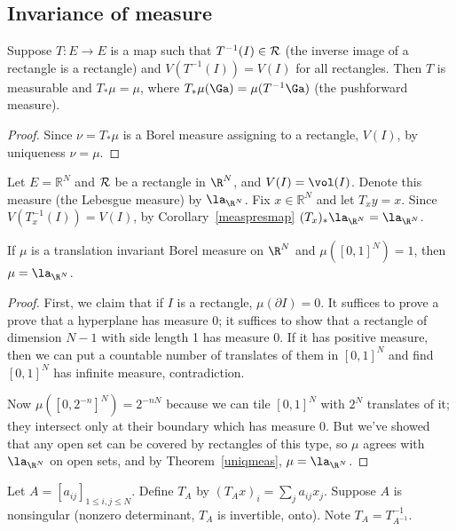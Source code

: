 \subsection{Invariance of measure}
\begin{cor}\label{measpresmap}
Suppose $T:E\to E$ is a map such that $T^{-1}(I)\in \cal R$ (the inverse image of a rectangle is a rectangle) and $V(T^{-1}(I))=V(I)$ for all rectangles. Then $T$ is measurable %
and $T_*\mu=\mu$, where $T_*\mu(\Ga)=\mu(T^{-1}\Ga)$ (the pushforward measure).
\end{cor}
\begin{proof}
Since $\nu=T_*\mu$ is a Borel measure assigning to a rectangle, $V(I)$, by uniqueness $\nu=\mu$.
\end{proof}
Let $E=\mathbb R^N$ and $\cal R$ be a rectangle in $\R^N$, and $V(I)=\vol(I)$. Denote this measure (the Lebesgue measure) by $\la_{\R^N}$. Fix $x\in \mathbb R^N$ and let $T_xy=x$. Since $V(T_x^{-1}(I))=V(I)$, by Corollary~\ref{measpresmap} $(T_x)_* \la_{\R^N}=\la_{\R^N}$. 
\begin{thm}
If $\mu$ is a translation invariant Borel measure on $\R^N$ and $\mu([0,1]^N)=1$, then $\mu=\la_{\R^N}$.
\end{thm}
\begin{proof}
First, we claim that if $I$ is a rectangle, $\mu(\partial I)=0$. It suffices to prove a prove that a hyperplane has measure 0; it suffices to show that a rectangle of dimension $N-1$ with side length 1 has measure 0. If it has positive measure, then we can put a countable number of translates of them in $[0,1]^N$ and find $[0,1]^N$ has infinite measure, contradiction. 

Now $\mu([0,2^{-n}]^N)=2^{-nN}$ because we can tile $[0,1]^N$ with $2^N$ translates of it; they intersect only at their boundary which has measure 0. But we've showed that any open set can be covered by rectangles of this type, so $\mu$ agrees with $\la_{\R^N}$ on open sets, and by Theorem~\ref{uniqmeas}, $\mu=\la_{\R^N}$.
\end{proof}

Let $A=[a_{ij}]_{1\leq i,j\leq N}$. Define $T_A$ by $(T_Ax)_i=\sum_{j}a_{ij}x_j.$
Suppose $A$ is nonsingular (nonzero determinant, $T_A$ is invertible, onto). Note $T_A=T_{A^{-1}}^{-1}$.

